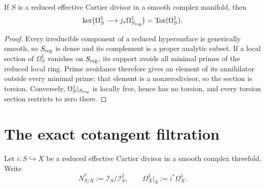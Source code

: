 \begin{lemma}
\label{lem:torsion-identification}
If $S$ is a reduced effective Cartier divisor in a smooth complex manifold,
then
\[
\ker\bigl(\Omega^1_S\longrightarrow j_*\Omega^1_{S_{\rm reg}}\bigr)
  =\operatorname{Tor}(\Omega^1_S).
\]
\end{lemma}

\begin{proof}
Every irreducible component of a reduced hypersurface is generically smooth,
so $S_{\rm reg}$ is dense and its complement is a proper analytic subset.
If a local section of $\Omega^1_S$ vanishes on $S_{\rm reg}$, its support avoids
all minimal primes of the reduced local ring.  Prime avoidance therefore gives
an element of its annihilator outside every minimal prime; that element is a
nonzerodivisor, so the section is torsion.  Conversely,
$\Omega^1_S|_{S_{\rm reg}}$ is locally free, hence has no torsion, and every
torsion section restricts to zero there.
\end{proof}

\section{The exact cotangent filtration}

Let $i:S\hookrightarrow X$ be a reduced effective Cartier divisor in a
smooth complex threefold.  Write
\[
 N^*_{S/X}:=\mathcal I_S/\mathcal I_S^2,
 \qquad
 \Omega^1_X|_S:=i^*\Omega^1_X.
\]

